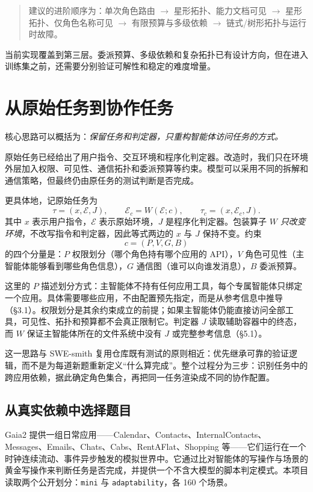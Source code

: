 \documentclass[UTF8,11pt,fontset=fandol]{ctexart}
\begin{document}
\begin{quote}
\small
\noindent 建议的进阶顺序为：单次角色路由 $\rightarrow$ 星形拓扑、能力文档可见 $\rightarrow$
星形拓扑、仅角色名称可见 $\rightarrow$ 有限预算与多级依赖 $\rightarrow$ 链式/树形拓扑与运行时故障。
\end{quote}

当前实现覆盖到第三层。委派预算、多级依赖和复杂拓扑已有设计方向，但在进入训练集之前，还需要分别验证可解性和稳定的难度增量。

\section{从原始任务到协作任务}

核心思路可以概括为：\emph{保留任务和判定器，只重构智能体访问任务的方式。}

原始任务已经给出了用户指令、交互环境和程序化判定器。改造时，我们只在环境外层加入权限、可见性、通信拓扑和委派预算等约束。模型可以采用不同的拆解和通信策略，但最终仍由原任务的测试判断是否完成。

更具体地，记原始任务为
\[
  \tau=(x,\mathcal{E},J),
  \qquad
  \mathcal{E}_c=W(\mathcal{E};c),
  \qquad
  \tau_c=(x,\mathcal{E}_c,J).
\]
其中 $x$ 表示用户指令，$\mathcal{E}$ 表示原始环境，$J$ 是程序化判定器。包装算子 $W$ \emph{只改变环境}，不改写指令和判定器，因此等式两边的 $x$ 与 $J$ 保持不变。约束
\[
  c=(P,V,G,B)
\]
的四个分量是：$P$ 权限划分（哪个角色持有哪个应用的 API），$V$ 角色可见性（主智能体能够看到哪些角色信息），$G$ 通信图（谁可以向谁发消息），$B$ 委派预算。

这里的 $P$ 描述划分方式：主智能体不持有任何应用工具，每个专属智能体只绑定一个应用。具体需要哪些应用，不由配置预先指定，而是从参考信息中推导（\S3.1）。权限划分是其余约束成立的前提；如果主智能体仍能直接访问全部工具，可见性、拓扑和预算都不会真正限制它。判定器 $J$ 读取辅助容器中的终态，而 $W$ 保证主智能体所在的文件系统中没有 $J$ 或完整参考信息（\S5.1）。

这一思路与 SWE-smith 复用仓库既有测试的原则相近\cite{yang2025swesmith}：优先继承可靠的验证逻辑，而不是为每道新题重新定义“什么算完成”。整个过程分为三步：识别任务中的跨应用依赖，据此确定角色集合，再把同一任务渲染成不同的协作配置。

\subsection{从真实依赖中选择题目}

Gaia2 提供一组日常应用——Calendar、Contacts、InternalContacts、Messages、Emails、Chats、Cabs、RentAFlat、Shopping 等——它们运行在一个时钟连续流动、事件异步触发的模拟世界中\cite{meta2025are}。它通过比对智能体的写操作与场景的黄金写操作来判断任务是否完成，并提供一个不含大模型的脚本判定模式。本项目读取两个公开划分：\texttt{mini} 与 \texttt{adaptability}，各 160 个场景。
\end{document}
